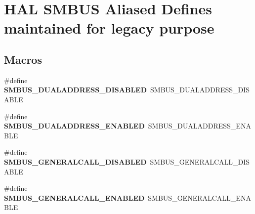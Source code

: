 \hypertarget{group___h_a_l___s_m_b_u_s___aliased___defines}{}\section{H\+AL S\+M\+B\+US Aliased Defines maintained for legacy purpose}
\label{group___h_a_l___s_m_b_u_s___aliased___defines}
\subsection*{Macros}
\begin{DoxyCompactItemize}
\item 
\mbox{\label{group___h_a_l___s_m_b_u_s___aliased___defines_gaddbad34ded349c11686df6c08aa6471a}} 
\#define {\bfseries S\+M\+B\+U\+S\+\_\+\+D\+U\+A\+L\+A\+D\+D\+R\+E\+S\+S\+\_\+\+D\+I\+S\+A\+B\+L\+ED}~S\+M\+B\+U\+S\+\_\+\+D\+U\+A\+L\+A\+D\+D\+R\+E\+S\+S\+\_\+\+D\+I\+S\+A\+B\+LE
\item 
\mbox{\label{group___h_a_l___s_m_b_u_s___aliased___defines_ga40e0af7474fce8b9658f0bb0bd5dcdb5}} 
\#define {\bfseries S\+M\+B\+U\+S\+\_\+\+D\+U\+A\+L\+A\+D\+D\+R\+E\+S\+S\+\_\+\+E\+N\+A\+B\+L\+ED}~S\+M\+B\+U\+S\+\_\+\+D\+U\+A\+L\+A\+D\+D\+R\+E\+S\+S\+\_\+\+E\+N\+A\+B\+LE
\item 
\mbox{\label{group___h_a_l___s_m_b_u_s___aliased___defines_gac6c7ef3413e8533e140fda0f1c882a0e}} 
\#define {\bfseries S\+M\+B\+U\+S\+\_\+\+G\+E\+N\+E\+R\+A\+L\+C\+A\+L\+L\+\_\+\+D\+I\+S\+A\+B\+L\+ED}~S\+M\+B\+U\+S\+\_\+\+G\+E\+N\+E\+R\+A\+L\+C\+A\+L\+L\+\_\+\+D\+I\+S\+A\+B\+LE
\item 
\mbox{\label{group___h_a_l___s_m_b_u_s___aliased___defines_ga395828b6264255bd2a51c17f3b473fea}} 
\#define {\bfseries S\+M\+B\+U\+S\+\_\+\+G\+E\+N\+E\+R\+A\+L\+C\+A\+L\+L\+\_\+\+E\+N\+A\+B\+L\+ED}~S\+M\+B\+U\+S\+\_\+\+G\+E\+N\+E\+R\+A\+L\+C\+A\+L\+L\+\_\+\+E\+N\+A\+B\+LE
\item 
\mbox{\label{group___h_a_l___s_m_b_u_s___aliased___defines_ga4fd6421c8f8dbb020249f49dd45a786e}} 

\end{DoxyCompactItemize}

